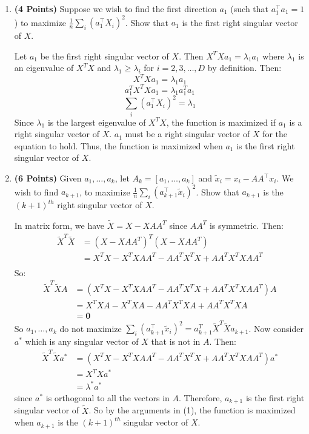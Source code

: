 \begin{enumerate}

\item  \textbf{(4 Points)}
Suppose we wish to find the first direction $a_1$ (such that $a_1^\top a_1 = 1$) to maximize $\frac{1}{n} \sum_i (a_1^\top X_i)^2$.
Show that $a_1$ is the first right singular vector of $X$.

\begin{soln}
  Let $a_1$ be the first right singular vector of $X$.
  Then $X^T X a_1 = \lambda_1 a_1$ where $\lambda_1$ is an eigenvalue of $X^T X$ and $\lambda_1 \geq \lambda_i$ for $i = 2, 3, \dots, D$ by definition.
  Then:
  $$ X^T X a_1 = \lambda_1 a_1 $$
  $$ a_1^T X^T X a_1 = \lambda_1 a_1^T a_1 $$
  $$ \sum_i (a_1^\top X_i)^2 = \lambda_1 $$
  Since $\lambda_1$ is the largest eigenvalue of $X^T X$, the function is maximized if $a_1$ is a right singular vector of $X$.
  $a_1$ must be a right singular vector of $X$ for the equation to hold.
  Thus, the function is maximized when $a_1$ is the first right singular vector of $X$.
\end{soln}

\item  \textbf{(6 Points)}
Given $a_1, \dots, a_k$, let $A_k = [a_1, \dots, a_k]$ and 
$\tilde{x}_i = x_i - A A^\top x_i$. We wish to find $a_{k+1}$, to maximize
$\frac{1}{n} \sum_i (a_{k+1}^\top \tilde{x}_i)^2$. Show that $a_{k+1}$ is the
$(k+1)^{th}$ right singular vector of $X$.

\begin{soln}
  In matrix form, we have $\tilde{X} = X - XAA^T$ since $AA^T$ is symmetric.
  Then:
  $$ 
  \begin{aligned}
    \tilde{X}^T \tilde{X} & = (X - XAA^T)^T (X - XAA^T) \\
    & = X^TX -X^TXAA^T - AA^TX^TX + AA^TX^TXAA^T \\
  \end{aligned}
  $$
  So:
  $$
  \begin{aligned}
    \tilde{X}^T \tilde{X} A & = (X^TX -X^TXAA^T - AA^TX^TX + AA^TX^TXAA^T) A \\
    & = X^TXA - X^TXA - AA^TX^TXA + AA^TX^TXA \\
    & = \mathbf{0}
  \end{aligned}
  $$
  So $a_1, \dots, a_k$ do not maximize $\sum_i (a_{k+1}^\top \tilde{x}_i)^2 = a_{k+1}^T \tilde{X}^T \tilde{X} a_{k+1}$. 
  Now consider $a^*$ which is any singular vector of $X$ that is not in $A$.
  Then:
  $$
  \begin{aligned}
    \tilde{X}^T \tilde{X} a^* & = (X^TX -X^TXAA^T - AA^TX^TX + AA^TX^TXAA^T) a^* \\
    & = X^TXa^* \\
    & = \lambda^* a^*
  \end{aligned}
  $$
  since $a^*$ is orthogonal to all the vectors in $A$.
  Therefore, $a_{k+1}$ is the first right singular vector of $\tilde{X}$.
  So by the arguments in (1), the function is maximized when $a_{k+1}$ is the $(k+1)^{th}$ singular vector of $X$.
\end{soln}




\end{enumerate}
